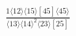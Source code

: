 \documentclass[varwidth, border=5pt]{standalone}
\begin{document}
\begin{my}
$\begin{gathered}
\scriptscriptstyle\frac{1⟨12⟩⟨15⟩[45]⟨45⟩}{⟨13⟩⟨14⟩^2⟨23⟩[25]}
\end{gathered}$
\end{my}
\end{document}
